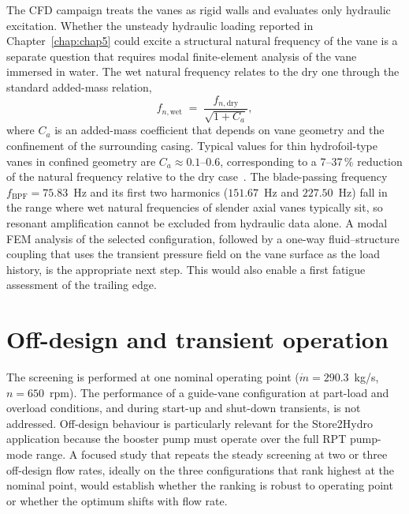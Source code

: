 The CFD campaign treats the vanes as rigid walls and evaluates only hydraulic excitation. Whether the unsteady hydraulic loading reported in Chapter~\ref{chap:chap5} could excite a structural natural frequency of the vane is a separate question that requires modal finite-element analysis of the vane immersed in water. The wet natural frequency relates to the dry one through the standard added-mass relation,
%
\begin{equation}
    f_{n,\mathrm{wet}}
    \;=\;
    \frac{f_{n,\mathrm{dry}}}{\sqrt{1 + C_a}},
    \label{eq:ch6:added_mass}
\end{equation}
%
where $C_a$ is an added-mass coefficient that depends on vane geometry and the confinement of the surrounding casing. Typical values for thin hydrofoil-type vanes in confined geometry are $C_a \approx 0.1$--$0.6$, corresponding to a 7--37\,\% reduction of the natural frequency relative to the dry case~\cite{Gulich2010}. The blade-passing frequency $f_{\mathrm{BPF}} = 75.83$~Hz and its first two harmonics ($151.67$~Hz and $227.50$~Hz) fall in the range where wet natural frequencies of slender axial vanes typically sit, so resonant amplification cannot be excluded from hydraulic data alone. A modal FEM analysis of the selected configuration, followed by a one-way fluid--structure coupling that uses the transient pressure field on the vane surface as the load history, is the appropriate next step. This would also enable a first fatigue assessment of the trailing edge.

\section*{Off-design and transient operation}

The screening is performed at one nominal operating point ($\dot m = 290.3$~kg/s, $n = 650$~rpm). The performance of a guide-vane configuration at part-load and overload conditions, and during start-up and shut-down transients, is not addressed. Off-design behaviour is particularly relevant for the Store2Hydro application because the booster pump must operate over the full RPT pump-mode range. A focused study that repeats the steady screening at two or three off-design flow rates, ideally on the three configurations that rank highest at the nominal point, would establish whether the ranking is robust to operating point or whether the optimum shifts with flow rate.

\clearpage